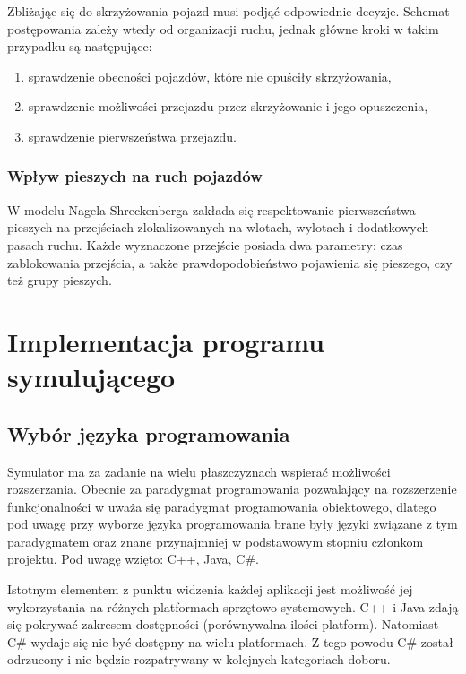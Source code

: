\documentclass{sprawozdanie-agh}
\begin{document}
	Zbliżając się do skrzyżowania pojazd musi podjąć odpowiednie decyzje. Schemat postępowania zależy wtedy od organizacji ruchu, jednak główne kroki w takim przypadku są następujące:

	\begin{enumerate}
		\item sprawdzenie obecności pojazdów, które nie opuściły skrzyżowania,
		\item sprawdzenie możliwości przejazdu przez skrzyżowanie i jego opuszczenia,
		\item sprawdzenie pierwszeństwa przejazdu.
	\end{enumerate}

	\subsubsection{Wpływ pieszych na ruch pojazdów}

	W modelu Nagela-Shreckenberga zakłada się respektowanie pierwszeństwa pieszych na przejściach zlokalizowanych na wlotach, wylotach i dodatkowych pasach ruchu. Każde wyznaczone przejście posiada dwa parametry: czas zablokowania przejścia, a także prawdopodobieństwo pojawienia się pieszego, czy też grupy pieszych.

	\section{Implementacja programu symulującego}

	\subsection{Wybór języka programowania}

	Symulator ma za zadanie na wielu płaszczyznach wspierać możliwości rozszerzania. Obecnie za paradygmat programowania pozwalający na rozszerzenie funkcjonalności w uważa się paradygmat programowania obiektowego, dlatego pod uwagę przy wyborze języka programowania brane były języki związane z tym paradygmatem oraz znane przynajmniej w podstawowym stopniu członkom projektu. Pod uwagę wzięto: C++, Java, C\#.

	Istotnym elementem z punktu widzenia każdej aplikacji jest możliwość jej wykorzystania na różnych platformach sprzętowo-systemowych. C++ i Java zdają się pokrywać zakresem dostępności (porównywalna ilości platform). Natomiast C\# wydaje się nie być dostępny na wielu platformach. Z tego powodu C\# został odrzucony i nie będzie rozpatrywany w kolejnych kategoriach doboru.
\end{document}
